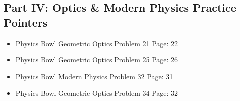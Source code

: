 ﻿\documentclass[12pt,a4paper]{article}
\begin{document}
\subsection*{Part IV: Optics \texorpdfstring{\&}{&} Modern Physics Practice Pointers}
\begin{itemize}[leftmargin=*]
  \item Physics Bowl Geometric Optics Problem 21 Page: 22
  \item Physics Bowl Geometric Optics Problem 25 Page: 26
  \item Physics Bowl Modern Physics Problem 32 Page: 31
  \item Physics Bowl Geometric Optics Problem 34 Page: 32
\end{itemize}

\end{document}
